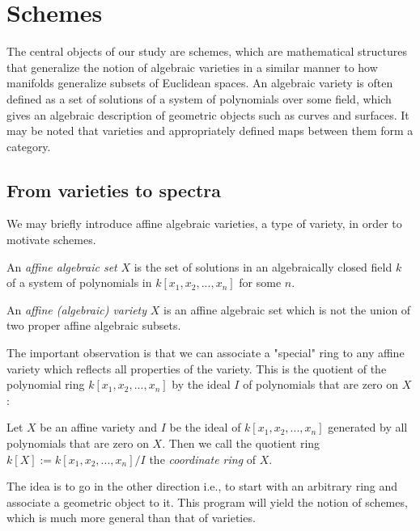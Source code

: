 \documentclass[ag.tex]{subfiles}
\begin{document}
\chapter{Schemes}

The central objects of our study are schemes,  which are mathematical structures that generalize the notion of algebraic varieties in a similar manner to how manifolds generalize subsets of Euclidean spaces.  An algebraic variety is often defined as a set of solutions of a system of polynomials over some field, which gives an algebraic description of geometric objects such as curves and surfaces.  It may be noted that varieties and appropriately defined maps between them form a category.

\section{From varieties to spectra}

We may briefly introduce affine algebraic varieties, a type of variety,  in order to motivate schemes.

\begin{definition}
An \textit{affine algebraic set} $X$ is the set of solutions in an algebraically closed field $k$ of a system of polynomials in $k[x_1,x_2,...,x_n]$ for some $n$.
\end{definition}

\begin{definition}
An \textit{affine (algebraic) variety} $X$ is an affine algebraic set which is not the union of two proper affine algebraic subsets.
\end{definition}

The important observation is that we can associate a "special" ring to any affine variety which reflects all properties of the variety.  This is the quotient of the polynomial ring $k[x_1,x_2,...,x_n]$ by the ideal $I$ of polynomials that are zero on $X$:

\begin{definition}
Let $X$ be an affine variety and $I$ be the ideal of $k[x_1,x_2,...,x_n]$ generated by all polynomials that are zero on $X$. Then we call the quotient ring $k[X] := k[x_1,x_2,...,x_n] / I$ the \textit{coordinate ring} of $X$.
\end{definition}

The idea is to go in the other direction i.e., to start with an arbitrary ring and associate a geometric object to it. This program will yield the notion of schemes, which is much more general than that of varieties. 
\end{document}
